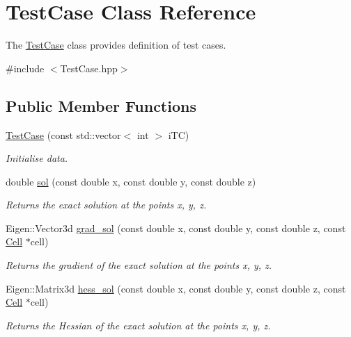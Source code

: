 \hypertarget{classTestCase}{}\section{Test\+Case Class Reference}
\label{classTestCase}


The \hyperlink{classTestCase}{Test\+Case} class provides definition of test cases.  




{\ttfamily \#include $<$Test\+Case.\+hpp$>$}

\subsection*{Public Member Functions}
\begin{DoxyCompactItemize}
\item 
\hyperlink{classTestCase_aa4ad29533416ee515205db87002a1bf1}{Test\+Case} (const std\+::vector$<$ int $>$ i\+TC)
\begin{DoxyCompactList}\small\item\em Initialise data. \end{DoxyCompactList}\item 
double \hyperlink{classTestCase_ac33657413d3b2af32c65ac8153137ff4}{sol} (const double x, const double y, const double z)
\begin{DoxyCompactList}\small\item\em Returns the exact solution at the points x, y, z. \end{DoxyCompactList}\item 
Eigen\+::\+Vector3d \hyperlink{classTestCase_a46b6847f3cdeca43af4b7c34e85748b9}{grad\+\_\+sol} (const double x, const double y, const double z, const \hyperlink{classHArDCore3D_1_1Cell}{Cell} $\ast$cell)
\begin{DoxyCompactList}\small\item\em Returns the gradient of the exact solution at the points x, y, z. \end{DoxyCompactList}\item 
Eigen\+::\+Matrix3d \hyperlink{classTestCase_a433ec3de5f6f54f5dadc75fcc18efb37}{hess\+\_\+sol} (const double x, const double y, const double z, const \hyperlink{classHArDCore3D_1_1Cell}{Cell} $\ast$cell)
\begin{DoxyCompactList}\small\item\em Returns the Hessian of the exact solution at the points x, y, z. \end{DoxyCompactList}\item 

\end{DoxyCompactItemize}
